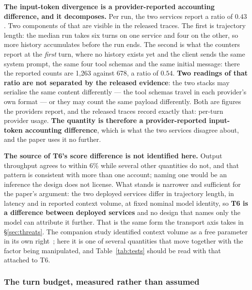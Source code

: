 \textbf{The input-token divergence is a provider-reported accounting difference, and it decomposes.} Per
run, the two services report a ratio of $0.43$. Two components of that are visible in the released traces.
The first is trajectory length: the median run takes six turns on one service and four on the other, so
more history accumulates before the run ends. The second is what the counters report at the \emph{first}
turn, where no history exists yet and the client sends the same system prompt, the same four tool schemas
and the same initial message: there the reported counts are 1{,}263 against 678, a ratio of $0.54$. \textbf{Two readings of that ratio
are not separated by the released evidence}: the two stacks may serialise the same content differently ---
the tool schemas travel in each provider's own format --- or they may count the same payload differently.
Both are figures the providers report, and the released traces record exactly that: per-turn provider
usage. \textbf{The quantity is therefore a provider-reported input-token accounting difference}, which is
what the two services disagree about, and the paper uses it no further.

\textbf{The source of T6's score difference is not identified here.} Output throughput agrees to within 6\%
while several other quantities do not, and that pattern is consistent with more than one account; naming
one would be an inference the design does not license. What stands is narrower and sufficient for the
paper's argument: the two deployed services differ in trajectory length, in latency and in reported context
volume, at fixed nominal model identity, so \textbf{T6 is a difference between deployed services} and no
design that names only the model can attribute it further. That is the same form the transport axis takes
in \S\ref{sec:threats}. The companion study identified context volume as a free parameter in its own
right~\citep{companion2026baseline}; here it is one of several quantities that move together with the
factor being manipulated, and Table~\ref{tab:tests} should be read with that attached to T6.

\subsubsection*{The turn budget, measured rather than assumed}
\label{sec:budget-turni}

